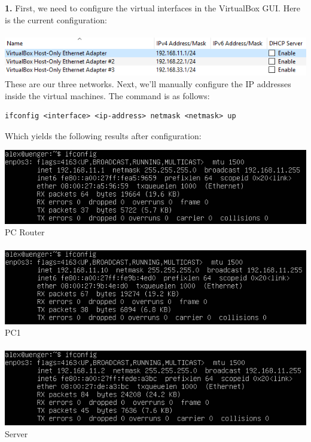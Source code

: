\documentclass[12pt]{extarticle}
\begin{document}
\textbf{1.} First, we need to configure the virtual interfaces in the VirtualBox GUI. Here is the current configuration:\\~\\
\includegraphics[scale=0.8]{resources/1-1-0.png}\\
These are our three networks. Next, we'll manually configure the IP addresses inside the virtual machines. The command is as follows:
\begin{verbatim}
ifconfig <interface> <ip-address> netmask <netmask> up
\end{verbatim}
Which yields the following results after configuration:\\
\begin{center}
\includegraphics[scale=0.8]{resources/1-1-1.png}\\
PC Router\\~\\
\includegraphics[scale=0.8]{resources/1-1-2.png}\\
PC1\\~\\
\includegraphics[scale=0.8]{resources/1-1-3.png}\\
Server
\end{center}
\end{document}
